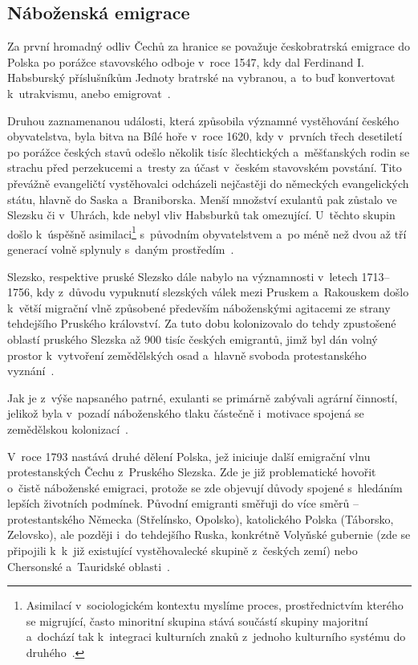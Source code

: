 \hypertarget{nuxe1boux17eenskuxe1-emigrace}{%
\subsection{Náboženská emigrace}\label{nuxe1boux17eenskuxe1-emigrace}}

Za první hromadný odliv Čechů za hranice se považuje českobratrská emigrace do Polska po porážce stavovského odboje v~roce 1547, kdy dal Ferdinand I. Habsburský příslušníkům Jednoty bratrské na vybranou, a~to buď konvertovat k~utrakvismu, anebo emigrovat~\parencite{Vaculik2009a}.

Druhou zaznamenanou události, která způsobila významné vystěhování českého obyvatelstva, byla bitva na Bílé hoře v~roce 1620, kdy v~prvních třech desetiletí po porážce českých stavů odešlo několik tisíc šlechtických a~měšťanských rodin se strachu před perzekucemi a~tresty za účast v~českém stavovském povstání. Tito převážně evangeličtí vystěhovalci odcházeli nejčastěji do německých evangelických státu, hlavně do Saska a~Braniborska. Menší množství exulantů pak zůstalo ve Slezsku či v~Uhrách, kde nebyl vliv Habsburků tak omezující. U~těchto skupin došlo k~úspěšně asimilaci\footnote{Asimilací v~sociologickém kontextu myslíme proces, prostřednictvím kterého se migrující, často minoritní skupina stává součástí skupiny majoritní a~dochází tak k~integraci kulturních znaků z~jednoho kulturního systému do druhého~\parencite{Petrusek2017}.} s~původním obyvatelstvem a~po méně než dvou až tří generací volně splynuly s~daným prostředím~\parencite{Vaculik2002}.

Slezsko, respektive pruské Slezsko dále nabylo na významnosti v~letech 1713--1756, kdy z~důvodu vypuknutí slezských válek mezi Pruskem a~Rakouskem došlo k~větší migrační vlně způsobené především náboženskými agitacemi ze strany tehdejšího Pruského království. Za tuto dobu kolonizovalo do tehdy zpustošené oblastí pruského Slezska až 900 tisíc českých emigrantů, jimž byl dán volný prostor k~vytvoření zemědělských osad a~hlavně svoboda protestanského vyznání~\parencite{Vaculik2002}.

Jak je z~výše napsaného patrné, exulanti se primárně zabývali agrární činností, jelikož byla v~pozadí náboženského tlaku částečně i~motivace spojená se zemědělskou kolonizací~\parencite{Broucek2017}.

V~roce 1793 nastává druhé dělení Polska, jež iniciuje další emigrační vlnu protestanských Čechu z~Pruského Slezska. Zde je již problematické hovořit o~čistě náboženské emigraci, protože se zde objevují důvody spojené s~hledáním lepších životních podmínek. Původní emigranti směřuji do více směrů -- protestantského Německa (Střelínsko, Opolsko), katolického Polska (Táborsko, Zelovsko), ale později i~do tehdejšího Ruska, konkrétně Volyňské gubernie (zde se připojili k~k~již existující vystěhovalecké skupině z~českých zemí) nebo Chersonské a~Tauridské oblasti~\parencite{Vaculik2009a}.

